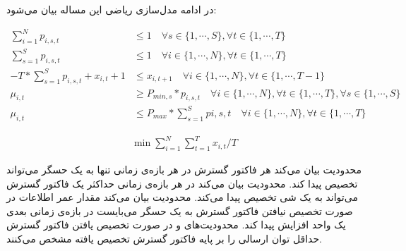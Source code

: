 

در ادامه مدل‌سازی ریاضی این مساله بیان می‌شود:

\begin{align}
  \sum_{i = 1}^{N} p_{i, s, t} &\le 1 \quad \forall s \in \{1, \cdots, S\}, \forall t \in \{1, \cdots, T\} \label{eq:constr_subchannel_limit} \\
  \sum_{s = 1}^{S} p_{i, s, t} &\le 1 \quad \forall i \in \{1, \cdots, N\}, \forall t \in \{1, \cdots, T\} \label{eq:constr_thing_limit} \\
  -T * \sum_{s = 1}^{S} p_{i, s, t} + x_{i, t} + 1 &\le x_{i, t + 1} \quad \forall i \in \{1, \cdots, N\}, \forall t \in \{1, \cdots, T - 1\} \label{eq:constr_aoi_limit} \\
  \mu_{i,t} &\ge P_{min, s} * p_{i, s, t} \quad \forall i \in \{1, \cdots, N\}, \forall t \in \{1, \cdots, T\}, \forall s \in \{1, \cdots, S\} \label{eq:power_range_1} \\
  \mu_{i, t} &\le P_{max} * \sum_{s = 1}^{S} p{i, s, t} \quad \forall i \in \{1, \cdots, N\}, \forall t \in \{1, \cdots, T\} \label{eq:power_range_2}
\end{align}

\begin{align}
  \min \sum_{i = 1}^{N} \sum_{t = 1}^{T} x_{i, t} / T
\end{align}


محدودیت  بیان می‌کند هر فاکتور گسترش در هر بازه‌ی زمانی تنها به یک حسگر می‌تواند تخصیص پیدا کند.
محدودیت  بیان می‌کند در هر بازه‌ی زمانی حداکثر یک فاکتور گسترش می‌تواند به یک شی تخصیص پیدا می‌کند.
محدودیت  بیان می‌کند مقدار عمر اطلاعات در صورت تخصیص نیافتن فاکتور گسترش به یک حسگر می‌بایست در بازه‌ی زمانی بعدی یک واحد افزایش پیدا کند.
محدودیت‌های  و  در صورت تخصیص یافتن فاکتور گسترش حداقل توان ارسالی را بر پایه فاکتور گسترش تخصیص یافته مشخص می‌کنند.
